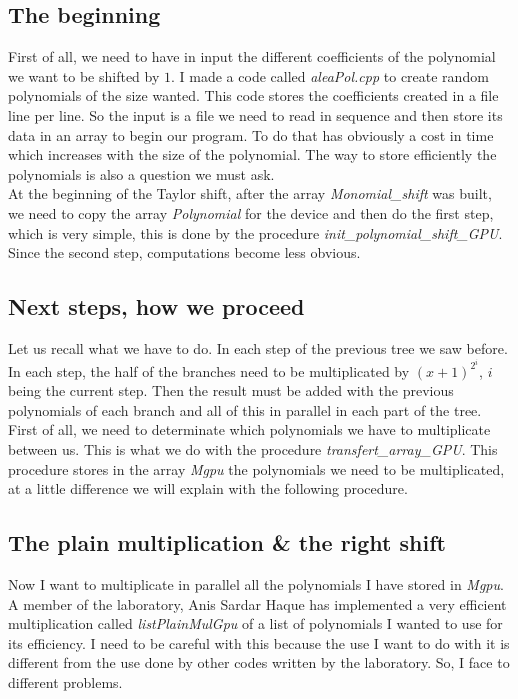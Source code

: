 \subsection{The beginning}
First of all, we need to have in input the different coefficients of the polynomial we want to be shifted by $1$. I made a code called \textit{aleaPol.cpp} to create random polynomials of the size wanted. This code stores the coefficients created in a file line per line. So the input is a file we need to read in sequence and then store its data in an array to begin our program. To do that has obviously a cost in time which increases with the size of the polynomial. The way to store efficiently the polynomials is also a question we must ask.\\

At the beginning of the Taylor shift, after the array \textit{Monomial\_shift} was built, we need to copy the array \textit{Polynomial} for the device and then do the first step, which is very simple, this is done by the procedure \textit{init\_polynomial\_shift\_GPU}.\\

Since the second step, computations become less obvious.

\subsection{Next steps, how we proceed}
Let us recall what we have to do. In each step of the previous tree we saw before. In each step, the half of the branches need to be multiplicated by $(x+1)^{2^i}$, $i$ being the current step. Then the result must be added with the previous polynomials of each branch and all of this in parallel in each part of the tree. First of all, we need to determinate which polynomials we have to multiplicate between us. This is what we do with the procedure \textit{transfert\_array\_GPU}. This procedure stores in the array \textit{Mgpu} the polynomials we need to be multiplicated, at a little difference we will explain with the following procedure.\\

\subsection{The plain multiplication \& the right shift}
Now I want to multiplicate in parallel all the polynomials I have stored in \textit{Mgpu}. A member of the laboratory, Anis Sardar Haque has implemented a very efficient multiplication called \textit{listPlainMulGpu} of a list of polynomials I wanted to use for its efficiency. I need to be careful with this because the use I want to do with it is different from the use done by other codes written by the laboratory. So, I face to different problems.\\

